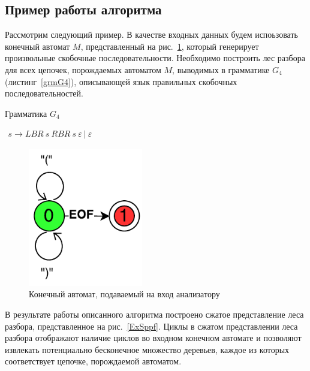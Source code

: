 \documentclass[14pt]{matmex-diploma}
\begin{document}
\subsection{Пример работы алгоритма}
Рассмотрим следующий пример. В качестве входных данных будем испоьзовать конечный автомат $M$, представленный на рис.~\ref{InputGraph}, который генерирует произвольные скобочные последовательности. Необходимо построить лес разбора для всех цепочек, порождаемых автоматом $M$, выводимых в грамматике $G_4$ (листинг~\ref{grmG4}), описывающей язык правильных скобочных последовательностей.
\begin{listing}
\caption{Грамматика $G_4$}
\label{grmG4}
\centering
$\begin{array}{rl}
s \rightarrow LBR \ s \ RBR \ s \ \varepsilon \  | \ \varepsilon 
\end{array}$
\end{listing}

\begin{figure}
 \centering
 \includegraphics[width=5cm]{pics/ExampleInputGraph.pdf}
 \caption{Конечный автомат, подаваемый на вход анализатору }
 \label{InputGraph}
\end{figure}

В результате работы описанного алгоритма построено сжатое представление леса разбора, представленное на рис.~\ref{ExSppf}. Циклы в сжатом представлении леса разбора отображают наличие циклов во входном конечном автомате и позволяют извлекать потенциально бесконечное множество деревьев, каждое из которых соответствует цепочке, порождаемой автоматом.
\end{document}
